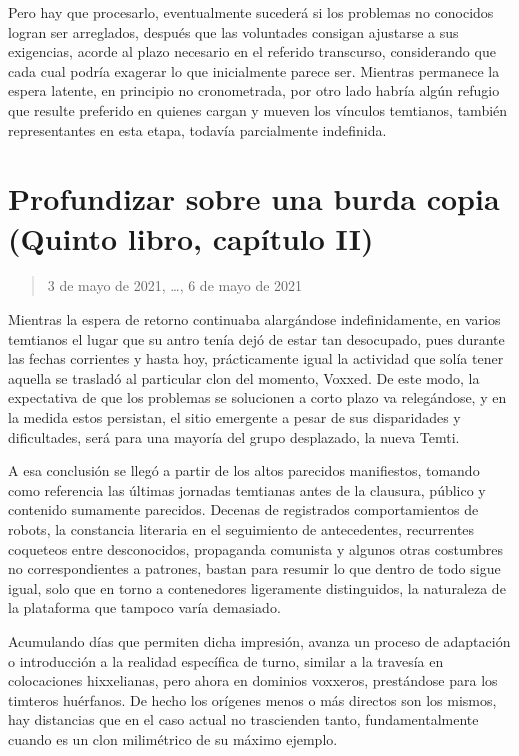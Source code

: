 \documentclass[
]{book}
\begin{document}
Pero hay que procesarlo, eventualmente sucederá si los problemas no conocidos logran ser arreglados, después que las voluntades consigan ajustarse a sus exigencias, acorde al plazo necesario en el referido transcurso, considerando que cada cual podría exagerar lo que inicialmente parece ser. Mientras permanece la espera latente, en principio no cronometrada, por otro lado habría algún refugio que resulte preferido en quienes cargan y mueven los vínculos temtianos, también representantes en esta etapa, todavía parcialmente indefinida.

\hypertarget{profundizar-sobre-una-burda-copia-quinto-libro-capuxedtulo-ii}{%
\section{Profundizar sobre una burda copia (Quinto libro, capítulo II)}\label{profundizar-sobre-una-burda-copia-quinto-libro-capuxedtulo-ii}}

\begin{quote}
3 de mayo de 2021, \ldots, 6 de mayo de 2021
\end{quote}

Mientras la espera de retorno continuaba alargándose indefinidamente, en varios temtianos el lugar que su antro tenía dejó de estar tan desocupado, pues durante las fechas corrientes y hasta hoy, prácticamente igual la actividad que solía tener aquella se trasladó al particular clon del momento, Voxxed. De este modo, la expectativa de que los problemas se solucionen a corto plazo va relegándose, y en la medida estos persistan, el sitio emergente a pesar de sus disparidades y dificultades, será para una mayoría del grupo desplazado, la nueva Temti.

A esa conclusión se llegó a partir de los altos parecidos manifiestos, tomando como referencia las últimas jornadas temtianas antes de la clausura, público y contenido sumamente parecidos. Decenas de registrados comportamientos de robots, la constancia literaria en el seguimiento de antecedentes, recurrentes coqueteos entre desconocidos, propaganda comunista y algunos otras costumbres no correspondientes a patrones, bastan para resumir lo que dentro de todo sigue igual, solo que en torno a contenedores ligeramente distinguidos, la naturaleza de la plataforma que tampoco varía demasiado.

Acumulando días que permiten dicha impresión, avanza un proceso de adaptación o introducción a la realidad específica de turno, similar a la travesía en colocaciones hixxelianas, pero ahora en dominios voxxeros, prestándose para los timteros huérfanos. De hecho los orígenes menos o más directos son los mismos, hay distancias que en el caso actual no trascienden tanto, fundamentalmente cuando es un clon milimétrico de su máximo ejemplo.
\end{document}
